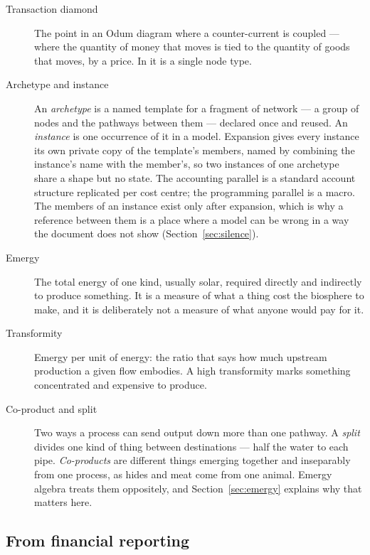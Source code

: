 \documentclass[11pt,a4paper]{article}
\begin{document}
\begin{description}
\item[Transaction diamond] The point in an Odum diagram where a counter-current is coupled --- where the quantity of money that moves is tied to the quantity of goods that moves, by a price. In \gssk{} it is a single node type.
\item[Archetype and instance] An \emph{archetype} is a named template for a fragment of network --- a group of nodes and the pathways between them --- declared once and reused. An \emph{instance} is one occurrence of it in a model. Expansion gives every instance its own private copy of the template's members, named by combining the instance's name with the member's, so two instances of one archetype share a shape but no state. The accounting parallel is a standard account structure replicated per cost centre; the programming parallel is a macro. The members of an instance exist only after expansion, which is why a reference between them is a place where a model can be wrong in a way the document does not show (Section~\ref{sec:silence}).
\item[Emergy] The total energy of one kind, usually solar, required directly and indirectly to produce something. It is a measure of what a thing cost the biosphere to make, and it is deliberately not a measure of what anyone would pay for it.
\item[Transformity] Emergy per unit of energy: the ratio that says how much upstream production a given flow embodies. A high transformity marks something concentrated and expensive to produce.
\item[Co-product and split] Two ways a process can send output down more than one pathway. A \emph{split} divides one kind of thing between destinations --- half the water to each pipe. \emph{Co-products} are different things emerging together and inseparably from one process, as hides and meat come from one animal. Emergy algebra treats them oppositely, and Section~\ref{sec:emergy} explains why that matters here.
\end{description}

\subsection{From financial reporting}
\end{document}

